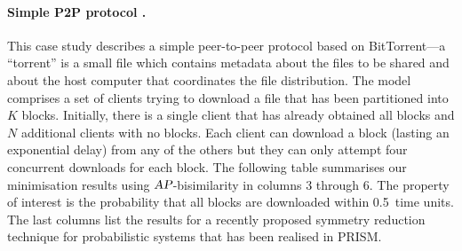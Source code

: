 \documentclass{llncs}
\begin{document}
\paragraph{Simple P2P protocol \cite{KwiatkowskaNP_CAV06}.}
This case study describes a simple peer-to-peer protocol based on BitTorrent---a ``torrent''
is a small file which contains metadata about the files to be shared and about the host 
computer that coordinates the file distribution. 
The model comprises a set of clients trying to download a file that has been partitioned 
into $K$ blocks. 
Initially, there is a single client that has already obtained all blocks and $N$ additional
clients with no blocks. 
Each client can download a block (lasting an exponential delay) from any of the others 
but they can only attempt four concurrent downloads for each block.
The following table summarises our minimisation results using $\mbox{\sl AP}$-bisimilarity
in columns 3 through 6.
The property of interest is the probability that all blocks are downloaded within
0.5~time units.
The last columns list the results for a recently proposed symmetry reduction technique 
for probabilistic systems  \cite{KwiatkowskaNP_CAV06} that has been realised in  PRISM.
\end{document}
